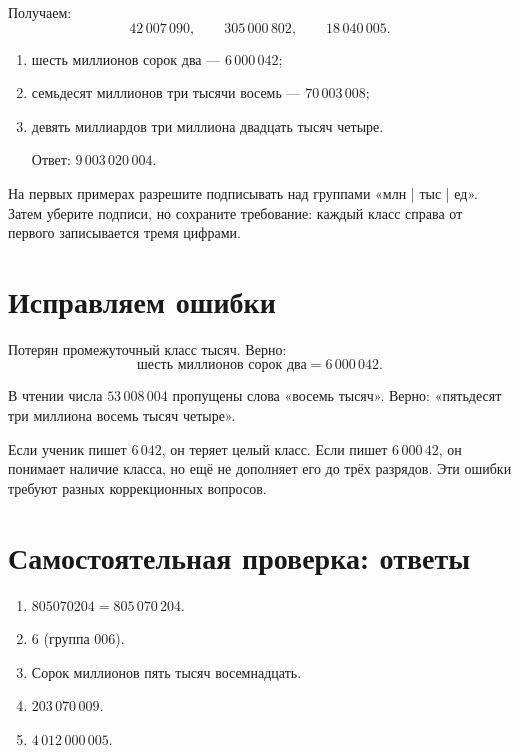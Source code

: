 Получаем:
\[
  42\,007\,090,\qquad
  305\,000\,802,\qquad
  18\,040\,005.
\]

\begin{fillbox}
  \begin{enumerate}
    \item шесть миллионов сорок два --- \(6\,000\,042\);
    \item семьдесят миллионов три тысячи восемь --- \(70\,003\,008\);
    \item девять миллиардов три миллиона двадцать тысяч четыре.\par
      Ответ: \(9\,003\,020\,004\).
  \end{enumerate}
\end{fillbox}

\begin{teacherbox}
  На первых примерах разрешите подписывать над группами «млн | тыс | ед».
  Затем уберите подписи, но сохраните требование: каждый класс справа от
  первого записывается тремя цифрами.
\end{teacherbox}

\section{Исправляем ошибки}

\begin{warningbox}[Ошибка 1]
  Потерян промежуточный класс тысяч. Верно:
  \[
    \text{шесть миллионов сорок два}=6\,000\,042.
  \]
\end{warningbox}

\begin{warningbox}[Ошибка 2]
  В чтении числа \(53\,008\,004\) пропущены слова «восемь тысяч».
  Верно: «пятьдесят три миллиона восемь тысяч четыре».
\end{warningbox}

\begin{teacherbox}
  Если ученик пишет \(6\,042\), он теряет целый класс. Если пишет
  \(6\,000\,42\), он понимает наличие класса, но ещё не дополняет его до
  трёх разрядов. Эти ошибки требуют разных коррекционных вопросов.
\end{teacherbox}

\section{Самостоятельная проверка: ответы}

\begin{resultbox}
  \begin{enumerate}
    \item \(805070204=805\,070\,204\).
    \item \(6\) (группа \(006\)).
    \item Сорок миллионов пять тысяч восемнадцать.
    \item \(203\,070\,009\).
    \item \(4\,012\,000\,005\).
  \end{enumerate}
\end{resultbox}

